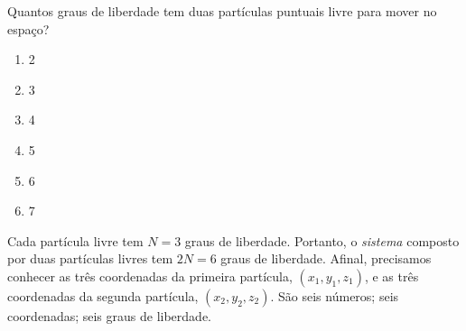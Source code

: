 \begin{question}
    Quantos graus de liberdade tem duas partículas puntuais livre para mover no espaço?
    \begin{enumerate}
      \item 2
      \item 3
      \item 4
      \item 5
      \item 6 \rightanswer
      \item 7
    \end{enumerate}

    \begin{solution}
      Cada partícula livre tem $N = 3$ graus de liberdade.
      Portanto, o \emph{sistema} composto por duas partículas livres tem $2N = 6$ graus de liberdade.
      Afinal, precisamos conhecer as três coordenadas da primeira partícula, $(x_1, y_1, z_1)$, e as três coordenadas da segunda partícula, $(x_2, y_2, z_2)$.
      São seis números; seis coordenadas; seis graus de liberdade.  
    \end{solution}
\end{question}